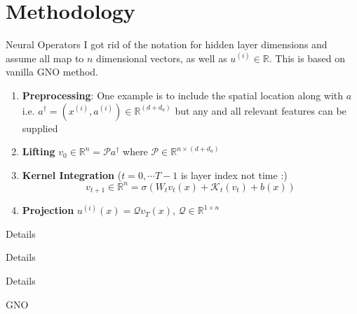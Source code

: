 \documentclass[usenames,dvipsnames]{beamer}
\theoremstyle{definition}
\begin{document}
\section{Methodology}
\begin{frame}{Neural Operators}
I got rid of the notation for hidden layer dimensions and assume all map to $n$ dimensional vectors, as well as $u^{(i)} \in \mathbb{R}$. This is  based on vanilla GNO method.

\begin{enumerate}
    \item \textbf{Preprocessing}: One example is to include the spatial location along with $a$ i.e. $a^{\dagger} = (x^{(i)}, a^{(i)}) \in \mathbb{R}^{(d + d_a)}$ but any and all relevant features can be supplied

    \item \textbf{Lifting} $v_0 \in \mathbb{R}^{n} = \mathcal{P}a^{\dagger}$ where $\mathcal{P} \in \mathbb{R}^{n \times (d + d_a)}$

    \item \textbf{Kernel Integration} ($t = 0, \cdots T - 1$ is layer index not time :) 
    $$v_{t + 1} \in  \mathbb{R}^n = \sigma \left(W_{t}v_t(x) + \mathcal{K}_t(v_t) + b(x)\right)$$

    \item \textbf{Projection} $u^{(i)}(x) = \mathcal{Q} v_T(x)$, $\mathcal{Q} \in \mathbb{R}^{1 \times n}$
\end{enumerate}
\end{frame}

    

\begin{frame}{Details}
\end{frame}

\begin{frame}{Details}
    
\end{frame}

\begin{frame}{Details}
    
\end{frame}

\begin{frame}{GNO}
    
\end{frame}
\end{document}
